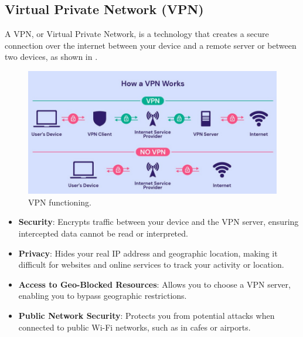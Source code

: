 \subsection{Virtual Private Network (VPN)}

A VPN, or Virtual Private Network, is a technology that creates a secure connection over the internet between your device and a remote server or between two devices, as shown in .

\begin{figure}[h!]
    \begin{center}
        \includegraphics[width=\textwidth]{images/vpn.jpg}
        \caption{VPN functioning.}
        \label{fig:vpn}
    \end{center}
\end{figure}

\begin{itemize}
    \item \textbf{Security}: Encrypts traffic between your device and the VPN server, ensuring intercepted data cannot be read or interpreted.
    \item \textbf{Privacy}: Hides your real IP address and geographic location, making it difficult for websites and online services to track your activity or location.
    \item \textbf{Access to Geo-Blocked Resources}: Allows you to choose a VPN server, enabling you to bypass geographic restrictions.
    \item \textbf{Public Network Security}: Protects you from potential attacks when connected to public Wi-Fi networks, such as in cafes or airports.
\end{itemize}

